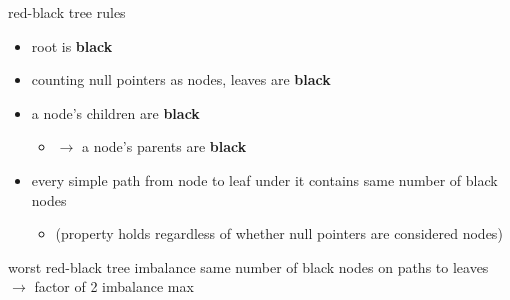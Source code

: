\begin{frame}{red-black tree rules}
    \begin{itemize}
    \item root is \textbf{black}
    \item counting null pointers as nodes, leaves are \textbf{black}
    \item a  node's children are \textbf{black}
        \begin{itemize}
            \item $\rightarrow$ a  node's parents are \textbf{black}
        \end{itemize}
    \item every simple path from node to leaf under it contains same number of black nodes
            \begin{itemize}
                \item (property holds regardless of whether null pointers are considered nodes)
            \end{itemize}
    \end{itemize}
\end{frame}


\begin{frame}{worst red-black tree imbalance}
same number of black nodes on paths to leaves \\
    $\rightarrow$ factor of 2 imbalance max \\
\end{frame}

